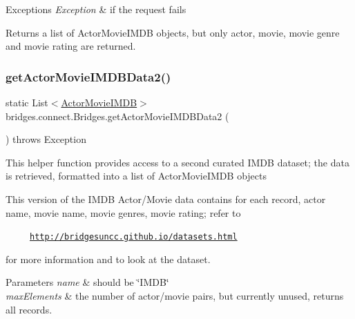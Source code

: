 \begin{DoxyExceptions}{Exceptions}
{\em Exception} & if the request fails\\
\hline
\end{DoxyExceptions}
\begin{DoxyReturn}{Returns}
a list of Actor\+Movie\+I\+M\+DB objects, but only actor, movie, movie genre and movie rating are returned. 
\end{DoxyReturn}
\mbox{\label{classbridges_1_1connect_1_1_bridges_a7a5f5efc6712ead5babe4cd21a4de3cc}} 
\subsubsection{\texorpdfstring{get\+Actor\+Movie\+I\+M\+D\+B\+Data2()}{getActorMovieIMDBData2()}}
{\footnotesize\ttfamily static List$<$\mbox{\hyperlink{classbridges_1_1data__src__dependent_1_1_actor_movie_i_m_d_b}{Actor\+Movie\+I\+M\+DB}}$>$ bridges.\+connect.\+Bridges.\+get\+Actor\+Movie\+I\+M\+D\+B\+Data2 (\begin{DoxyParamCaption}{ }\end{DoxyParamCaption}) throws Exception\hspace{0.3cm}{\ttfamily [static]}}

This helper function provides access to a second curated I\+M\+DB dataset; the data is retrieved, formatted into a list of Actor\+Movie\+I\+M\+DB objects

This version of the I\+M\+DB Actor/\+Movie data contains for each record, actor name, movie name, movie genres, movie rating; refer to 

~~~~~\href{http://bridgesuncc.github.io/datasets.html}{\tt http\+://bridgesuncc.\+github.\+io/datasets.\+html} 

for more information and to look at the dataset.


\begin{DoxyParams}{Parameters}
{\em name} & should be \char`\"{}\+I\+M\+D\+B\char`\"{} \\
\hline
{\em max\+Elements} & the number of actor/movie pairs, but currently unused, returns all records. \\
\hline
\end{DoxyParams}

